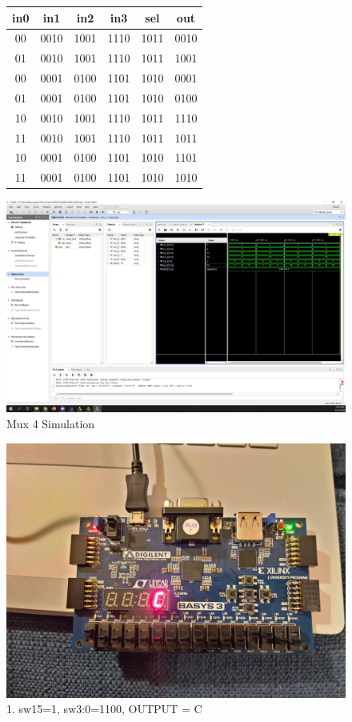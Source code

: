\documentclass[11pt]{article}
\begin{document}
\begin{figure}[ht] \centering
	
	\begin{tabular}{ccccc|c}
		\toprule
		in0 & in1 & in2 & in3 & sel & out \\
		\midrule
		00 & 0010 & 1001 & 1110 & 1011 & 0010 \\
		01 & 0010 & 1001 & 1110 & 1011 & 1001 \\
		00 & 0001 & 0100 & 1101 & 1010 & 0001 \\
		01 & 0001 & 0100 & 1101 & 1010 & 0100 \\
		10 & 0010 & 1001 & 1110 & 1011 & 1110 \\
		11 & 0010 & 1001 & 1110 & 1011 & 1011 \\
		10 & 0001 & 0100 & 1101 & 1010 & 1101 \\
		11 & 0001 & 0100 & 1101 & 1010 & 1010 \\
		\bottomrule
	\end{tabular}
	
	\includegraphics[width=1\textwidth,trim=21cm 19cm 0cm 6cm,clip]{mux4_test_scrn}
	\caption{Mux 4 Simulation}
	\label{fig:img2}
\end{figure}


\begin{figure}[ht]\centering
	\includegraphics[width=.5\textwidth]{board1}
	\caption{1. sw15=1, sw3:0=1100, OUTPUT = C}
	\label{fig:b3_1}			
\end{figure}
\end{document}

